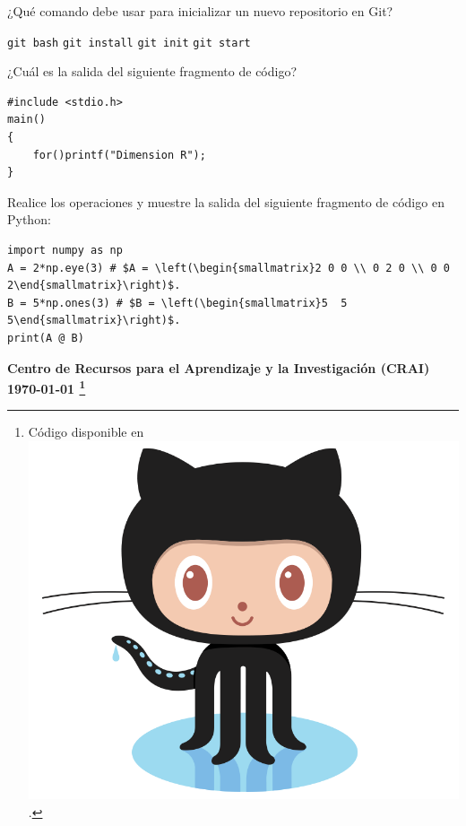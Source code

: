 \documentclass[spanish,addpoints,answers,a4paper]{exam}
\newcommand{\unmarkedfntext}[1]{%
	\begingroup
	\renewcommand\thefootnote{}\footnote{#1}%
	\addtocounter{footnote}{-1}%
	\endgroup
}
\newcommand{\mychar}{%
	\begingroup\normalfont
	\includegraphics[height=\fontcharht\font`\B]{Octocat.png}%
	\endgroup
}
\begin{document}
\begin{questions}
\question ¿Qué comando debe usar para inicializar un nuevo repositorio en Git?

\begin{multicols}{4}
\begin{checkboxes}
	\choice \texttt{git bash}
	\choice \texttt{git install}
	\choice \texttt{git init} %
	\choice \texttt{git start}
\end{checkboxes}
\end{multicols}

\question ¿Cuál es la salida del siguiente fragmento de código?

\begin{verbatim}
#include <stdio.h>
main()
{
	for()printf("Dimension R");
}
\end{verbatim}
\makeemptybox{0.5in}


\question Realice los operaciones y muestre la salida del siguiente fragmento de código en Python:
\begin{verbatim}
import numpy as np
A = 2*np.eye(3) # $A = \left(\begin{smallmatrix}2 0 0 \\ 0 2 0 \\ 0 0 2\end{smallmatrix}\right)$.
B = 5*np.ones(3) # $B = \left(\begin{smallmatrix}5  5  5\end{smallmatrix}\right)$.
print(A @ B)
\end{verbatim}

\makeemptybox{1.2in}

\end{questions}
\vfill
\begin{flushright}\bfseries
Centro de Recursos para el Aprendizaje y la Investigación (CRAI)\\[2mm]
\today\unmarkedfntext{Código disponible en \href{https://github.com/carlosal1015/LaTeX-and-friends}{\mychar{}}.}
\end{flushright}
\end{document}
